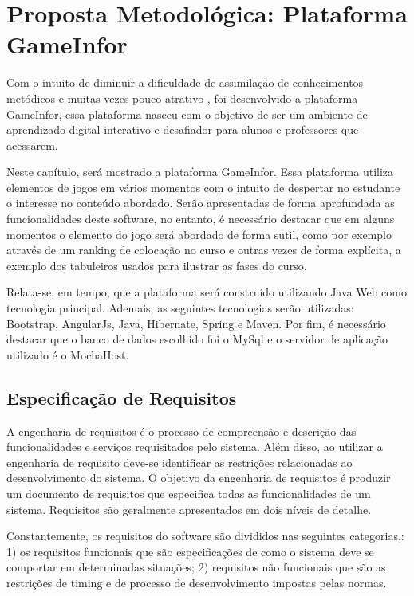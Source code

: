 \chapter{Proposta Metodológica: Plataforma GameInfor}
\label{ch:finsbus}

Com o intuito de diminuir a dificuldade de assimilação de conhecimentos metódicos e muitas vezes pouco atrativo \citep{GomesZuin}, foi desenvolvido a plataforma GameInfor, essa plataforma nasceu com o objetivo de ser um ambiente de aprendizado digital interativo e desafiador para alunos e professores que acessarem.


Neste capítulo, será mostrado a plataforma GameInfor. Essa plataforma utiliza elementos de jogos em vários momentos com o intuito de despertar no estudante o interesse no conteúdo abordado. Serão apresentadas de forma aprofundada as funcionalidades deste software, no entanto, é necessário destacar que em alguns momentos o elemento do jogo será abordado de forma sutil, como por exemplo através de um ranking de colocação no curso e outras vezes de forma explícita, a exemplo dos tabuleiros usados para ilustrar as fases do curso.

Relata-se, em tempo, que a plataforma será construído utilizando Java Web como tecnologia principal. Ademais, as seguintes tecnologias serão utilizadas: Bootstrap, AngularJs, Java, Hibernate, Spring e Maven. Por fim, é necessário destacar que o banco de dados escolhido foi o MySql e o servidor de aplicação utilizado é o MochaHost.

\section{Especificação de Requisitos}
\label{sc:EspecificacaoRequisitos}

A engenharia de requisitos é o processo de compreensão e descrição das funcionalidades e serviços requisitados pelo sistema. Além disso, ao utilizar a engenharia de requisito deve-se identificar as restrições relacionadas ao desenvolvimento do sistema. O objetivo da engenharia de requisitos é produzir um documento de requisitos que especifica todas as funcionalidades de um sistema. Requisitos são geralmente apresentados em dois níveis de detalhe.  \citep{SOMMERVILLE2011}

Constantemente, os requisitos do software são divididos nas seguintes categorias,: 1) os requisitos funcionais que são especificações de como o sistema deve se comportar em determinadas situações; 2) requisitos não funcionais que são as restrições de timing e de processo de desenvolvimento impostas pelas normas. \citep{SOMMERVILLE2011}

